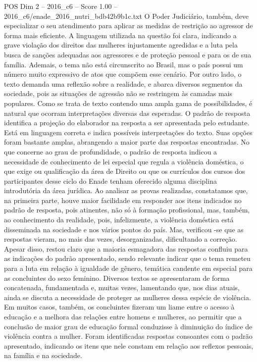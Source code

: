 \begin{textsample}{POS Dim 2 – 2016\_c6 – Score 1.00 – 2016\_c6/enade\_2016\_nutri\_bdb42b9b1c.txt}
O Poder Judiciário, também, deve especializar o seu atendimento para aplicar as medidas de restrição ao agressor de forma mais eficiente.
A linguagem utilizada na questão foi clara, indicando a grave violação dos direitos das mulheres injustamente agredidas e a luta pela busca de sanções adequadas aos agressores e de proteção pessoal e para os de sua família.
Ademais, o tema não está circunscrito ao Brasil, mas o país possui um número muito expressivo de atos que compõem esse cenário.
Por outro lado, o texto demanda uma reflexão sobre a realidade, e abarca diversos segmentos da sociedade, pois as situações de agressão não se restringem às camadas mais populares.
Como se trata de texto contendo uma ampla gama de possibilidades, é natural que ocorram interpretações diversas das esperadas.
O padrão de resposta identifica a projeção do elaborador na resposta a ser apresentada pelo estudante.
Está em linguagem correta e indica possíveis interpretações do texto.
Suas opções foram bastante amplas, abrangendo a maior parte das respostas encontradas.
No que concerne ao grau de profundidade, o padrão de resposta indicou a necessidade de conhecimento de lei especial que regula a violência doméstica, o que exige ou qualificação da área de Direito ou que os currículos dos cursos dos participantes desse ciclo do Enade tenham oferecido alguma disciplina introdutória da área jurídica.
Ao analisar as provas realizadas, constatamos que, na primeira parte, houve maior facilidade em responder aos itens indicados no padrão de resposta, pois atinentes, não só à formação profissional, mas, também, ao conhecimento da realidade, pois, infelizmente, a violência doméstica está disseminada na sociedade e nos vários pontos do país.
Mas, verificou -se que as respostas vieram, no mais das vezes, desorganizadas, dificultando a correção.
Apesar disso, restou claro que a maioria esmagadora das respostas confluiu para as indicações do padrão apresentado, sendo relevante indicar que o tema remeteu para a luta em relação à igualdade de gênero, temática candente em especial para as concluintes do sexo feminino.
Diversos textos se apresentaram de forma concatenada, fundamentada e, muitas vezes, lamentando que, nos dias atuais, ainda se discuta a necessidade de proteger as mulheres dessa espécie de violência.
Em muitos casos, também, os concluintes fizeram um liame entre o acesso à educação e a melhora das relações entre homens e mulheres, ao permitir que a conclusão de maior grau de educação formal conduzisse à diminuição do índice de violência contra a mulher.
Foram identificadas respostas consoantes com o padrão apresentado, indicando os itens que nele constam em relação aos reflexos pessoais, na família e na sociedade.

\end{textsample}
